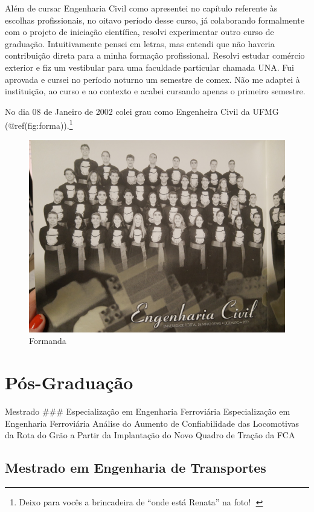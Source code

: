 \documentclass[
]{book}
\begin{document}
Além de cursar Engenharia Civil como apresentei no capítulo referente às
escolhas profissionais, no oitavo período desse curso, já colaborando
formalmente com o projeto de iniciação científica, resolvi experimentar
outro curso de graduação. Intuitivamente pensei em letras, mas entendi
que não haveria contribuição direta para a minha formação profissional.
Resolvi estudar comércio exterior e fiz um vestibular para uma faculdade
particular chamada UNA. Fui aprovada e cursei no período noturno um
semestre de comex. Não me adaptei à instituição, ao curso e ao contexto
e acabei cursando apenas o primeiro semestre.

No dia 08 de Janeiro de 2002 colei grau como Engenheira Civil da UFMG
(@ref(fig:forma)).\footnote{Deixo para vocês a brincadeira de ``onde
  está Renata'' na foto! 🤪}

\begin{figure}
\includegraphics[width=1\linewidth]{img/forma} \caption{Formanda}\label{fig:forma}
\end{figure}

\hypertarget{puxf3s-graduauxe7uxe3o}{%
\section{Pós-Graduação}\label{puxf3s-graduauxe7uxe3o}}

Mestrado \#\#\# Especialização em Engenharia Ferroviária Especialização
em Engenharia Ferroviária Análise do Aumento de Confiabilidade das
Locomotivas da Rota do Grão a Partir da Implantação do Novo Quadro de
Tração da FCA

\hypertarget{mestrado-em-engenharia-de-transportes}{%
\subsection{Mestrado em Engenharia de
Transportes}\label{mestrado-em-engenharia-de-transportes}}
\end{document}
